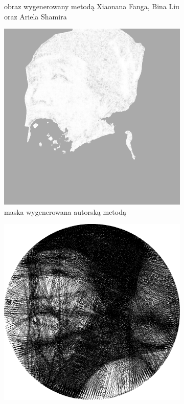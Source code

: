 \begin{figure}[H]
\begin{subfigure}{0.24\textwidth}
        \caption{obraz wygenerowany metodą Xiaonana Fanga, Bina Liu oraz Ariela Shamira}
        \label{comp-comp-dufu-gogh-b}
    \end{subfigure}
    \begin{subfigure}{0.24\textwidth}
        \centering
        \includegraphics[width = \textwidth]{img/6-comp/dufu_mask_c15_inv0_bg10_obj5_ed5.png}
        \caption{maska wygenerowana autorską metodą}
        \label{comp-comp-dufu-gogh-c}
    \end{subfigure}
    \begin{subfigure}{0.24\textwidth}
        \centering
        \includegraphics[width = \textwidth]{img/6-comp/dufu_e_i3000_c15_inv0_bg10_obj5_ed5.png}

\end{subfigure}
\end{figure}
